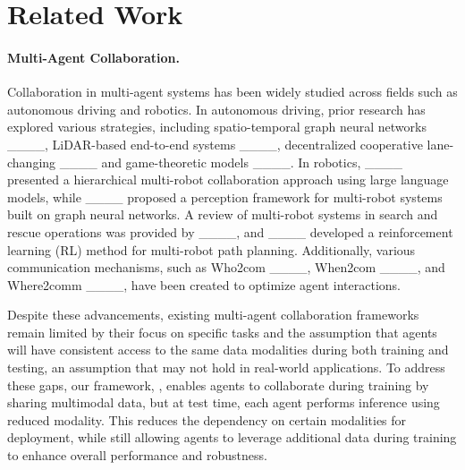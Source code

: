 \section{Related Work}

\paragraph{Multi-Agent Collaboration.}
Collaboration in multi-agent systems has been widely studied across fields such as autonomous driving and robotics. In autonomous driving, prior research has explored various strategies, including spatio-temporal graph neural networks ____, LiDAR-based end-to-end systems ____, decentralized cooperative lane-changing ____ and game-theoretic models ____. In robotics, ____ presented a hierarchical multi-robot collaboration approach using large language models, while ____ proposed a perception framework for multi-robot systems built on graph neural networks. A review of multi-robot systems in search and rescue operations was provided by ____, and ____ developed a reinforcement learning (RL) method for multi-robot path planning. Additionally, various communication mechanisms, such as Who2com ____, When2com ____, and Where2comm ____, have been created to optimize agent interactions.

Despite these advancements, existing multi-agent collaboration frameworks remain limited by their focus on specific tasks and the assumption that agents will have consistent access to the same data modalities during both training and testing, an assumption that may not hold in real-world applications. To address these gaps, our framework, \ours, enables agents to collaborate during training by sharing multimodal data, but at test time, each agent performs inference using reduced modality. This reduces the dependency on certain modalities for deployment, while still allowing agents to leverage additional data during training to enhance overall performance and robustness.
\vspace{-6pt}
